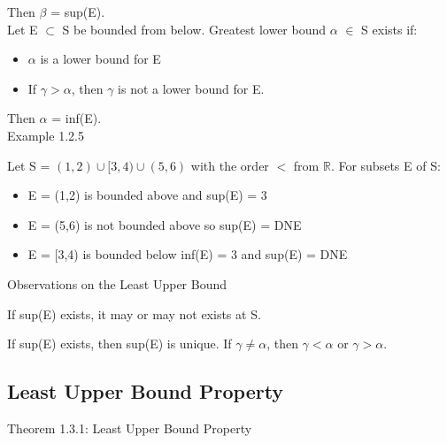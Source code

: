 	\hspace{2cm}
	Then $\beta$ = sup(E). \\

	\hspace{1cm}
	Let E $\subset$ S be bounded from below.
	Greatest lower bound $\alpha$ $\in$ S exists if:
	
	\begin{itemize}[leftmargin=2cm , itemsep=0.1cm]
		\item $\alpha$ is a lower bound for E

		\item If $\gamma > \alpha$, then $\gamma$ is not a lower bound for E.
	\end{itemize}

	\hspace{2cm}
	Then $\alpha$ = inf(E). \\

{ \color{purple} Example 1.2.5 }

	\hspace{1cm}
	Let S = $ (1,2) \cup [3,4) \cup (5,6) $ with the order $ < $ from $ \mathbb{R} $.
	For subsets E of S:

	\begin{itemize}[leftmargin=2cm, itemsep=0.1cm]
		\item E = (1,2) is bounded above and sup(E) = 3
	
		\item E = (5,6) is not bounded above so sup(E) = DNE
	
		\item E = [3,4) is bounded below inf(E) = 3 and sup(E) = DNE \\
	\end{itemize}

{ \color{blue} Observations on the Least Upper Bound }

	\hspace{1cm}
	If sup(E) exists, it may or may not exists at S.

	\hspace{1cm}
	If sup(E)  exists, then sup(E) is unique.
	If $ \gamma \neq \alpha $, then $ \gamma < \alpha $ or $ \gamma > \alpha $.




	
\subsection{Least Upper Bound Property}

{ \color{red} Theorem 1.3.1: Least Upper Bound Property }

